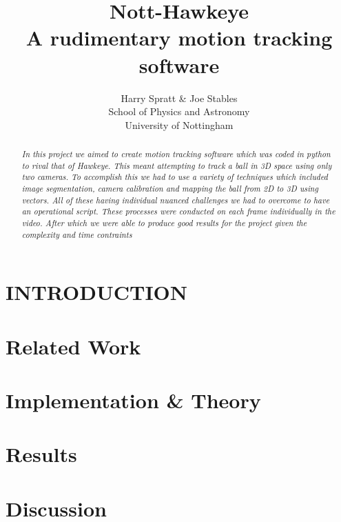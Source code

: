 \documentclass[letterpaper, 10 pt, conference]{ieeeconf}  %
\title{\LARGE \bf Nott-Hawkeye \\ A rudimentary motion tracking software}
\author{Harry Spratt \& Joe Stables%
\\  School of Physics and Astronomy \\
University of Nottingham \\
}
\begin{document}
\maketitle
\thispagestyle{plain}
\pagestyle{plain}



\begin{abstract}

\emph{
In this project we aimed to create motion tracking software which was coded in python to rival that of Hawkeye. This meant attempting to track a ball in 3D space using only two cameras. To accomplish this we had to use a variety of techniques which included image segmentation, camera calibration and mapping the ball from 2D to 3D using vectors. All of these having individual nuanced challenges we had to overcome to have an operational script. These processes were conducted on each frame individually in the video. After which we were able to produce good results for the project given the complexity and time contraints\\
}
\end{abstract}

\section{INTRODUCTION}



\section{Related Work}



\section{Implementation \& Theory}



\section{Results}



\section{Discussion}
\end{document}

